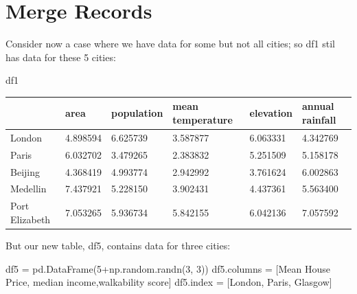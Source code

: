 \documentclass[
  letterpaper,
  DIV=11,
  numbers=noendperiod]{scrreprt}
\newenvironment{Shaded}{\begin{snugshade}}{\end{snugshade}}
\newcommand{\DecValTok}[1]{\textcolor[rgb]{0.68,0.00,0.00}{#1}}
\newcommand{\NormalTok}[1]{\textcolor[rgb]{0.00,0.23,0.31}{#1}}
\newcommand{\OperatorTok}[1]{\textcolor[rgb]{0.37,0.37,0.37}{#1}}
\newcommand{\StringTok}[1]{\textcolor[rgb]{0.13,0.47,0.30}{#1}}
\begin{document}
\hypertarget{merge-records}{%
\section{Merge Records}\label{merge-records}}

Consider now a case where we have data for some but not all cities; so
df1 stil has data for these 5 cities:

\begin{Shaded}
\begin{Highlighting}[]
\NormalTok{df1}
\end{Highlighting}
\end{Shaded}

\begin{longtable}[]{@{}llllll@{}}
\toprule\noalign{}
& area & population & mean temperature & elevation & annual rainfall \\
\midrule\noalign{}
\endhead
\bottomrule\noalign{}
\endlastfoot
London & 4.898594 & 6.625739 & 3.587877 & 6.063331 & 4.342769 \\
Paris & 6.032702 & 3.479265 & 2.383832 & 5.251509 & 5.158178 \\
Beijing & 4.368419 & 4.993774 & 2.942992 & 3.761624 & 6.002863 \\
Medellin & 7.437921 & 5.228150 & 3.902431 & 4.437361 & 5.563400 \\
Port Elizabeth & 7.053265 & 5.936734 & 5.842155 & 6.042136 & 7.057592 \\
\end{longtable}

But our new table, df5, contains data for three cities:

\begin{Shaded}
\begin{Highlighting}[]
\NormalTok{df5 }\OperatorTok{=}\NormalTok{ pd.DataFrame(}\DecValTok{5}\OperatorTok{+}\NormalTok{np.random.randn(}\DecValTok{3}\NormalTok{, }\DecValTok{3}\NormalTok{))}
\NormalTok{df5.columns }\OperatorTok{=}\NormalTok{ [}\StringTok{\textquotesingle{}Mean House Price\textquotesingle{}}\NormalTok{, }\StringTok{\textquotesingle{}median income\textquotesingle{}}\NormalTok{,}\StringTok{\textquotesingle{}walkability score\textquotesingle{}}\NormalTok{]}
\NormalTok{df5.index }\OperatorTok{=}\NormalTok{ [}\StringTok{\textquotesingle{}London\textquotesingle{}}\NormalTok{, }\StringTok{\textquotesingle{}Paris\textquotesingle{}}\NormalTok{, }\StringTok{\textquotesingle{}Glasgow\textquotesingle{}}\NormalTok{]}
\end{Highlighting}
\end{Shaded}
\end{document}
